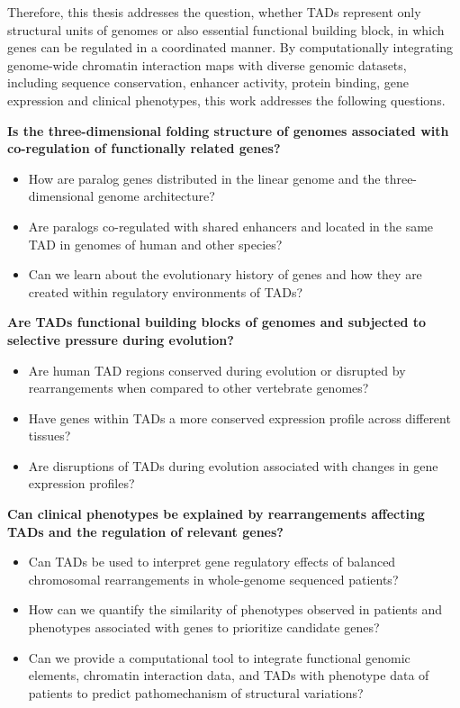 \documentclass[a4paper,twoside=true,openright,parskip=full,chapterprefix=true,11pt,headings=normal,bibliography=totoc,listof=totoc,titlepage=on,captions=tableabove,draft=false]{scrreprt}
\providecommand{\tightlist}{%
  \setlength{\itemsep}{0pt}\setlength{\parskip}{0pt}}
\theoremstyle{definition}
\theoremstyle{definition}
\theoremstyle{definition}
\theoremstyle{remark}
\begin{document}
Therefore, this thesis addresses the question, whether TADs represent
only structural units of genomes or also essential functional building
block, in which genes can be regulated in a coordinated manner. By
computationally integrating genome-wide chromatin interaction maps with
diverse genomic datasets, including sequence conservation, enhancer
activity, protein binding, gene expression and clinical phenotypes, this
work addresses the following questions.

\textbf{Is the three-dimensional folding structure of genomes associated
with co-regulation of functionally related genes?}

\begin{itemize}
\tightlist
\item
  How are paralog genes distributed in the linear genome and the
  three-dimensional genome architecture?
\item
  Are paralogs co-regulated with shared enhancers and located in the
  same TAD in genomes of human and other species?
\item
  Can we learn about the evolutionary history of genes and how they are
  created within regulatory environments of TADs?
\end{itemize}

\textbf{Are TADs functional building blocks of genomes and subjected to
selective pressure during evolution?}

\begin{itemize}
\tightlist
\item
  Are human TAD regions conserved during evolution or disrupted by
  rearrangements when compared to other vertebrate genomes?
\item
  Have genes within TADs a more conserved expression profile across
  different tissues?
\item
  Are disruptions of TADs during evolution associated with changes in
  gene expression profiles?
\end{itemize}

\textbf{Can clinical phenotypes be explained by rearrangements affecting
TADs and the regulation of relevant genes?}

\begin{itemize}
\tightlist
\item
  Can TADs be used to interpret gene regulatory effects of balanced
  chromosomal rearrangements in whole-genome sequenced patients?
\item
  How can we quantify the similarity of phenotypes observed in patients
  and phenotypes associated with genes to prioritize candidate genes?
\item
  Can we provide a computational tool to integrate functional genomic
  elements, chromatin interaction data, and TADs with phenotype data of
  patients to predict pathomechanism of structural variations?
\end{itemize}
\end{document}
